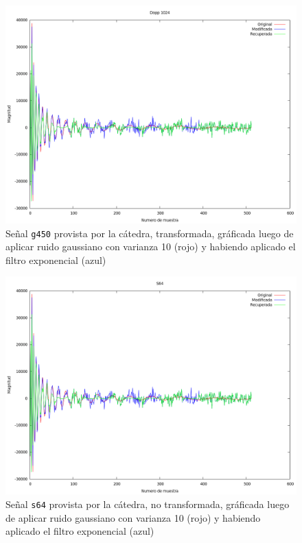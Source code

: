 \begin{figure}[H]
\begin {center}
\includegraphics[width=500pt]{imagenes/dopp1024-gauss-10-exp.png}
\end {center}
\caption{Se\~nal \texttt{g450} provista por la c\'atedra, transformada, gr\'aficada
luego de aplicar ruido gaussiano con varianza 10 (rojo) y 
habiendo aplicado el filtro exponencial (azul)}
\label{fig:GexpSpec}
\end{figure}

\begin{figure}[H]
\begin {center}
\includegraphics[width=500pt]{imagenes/s64-gauss-10-exp.png}
\end {center}
\caption{Se\~nal \texttt{s64} provista por la c\'atedra, no transformada, gr\'aficada
luego de aplicar ruido gaussiano con varianza 10 (rojo) y 
habiendo aplicado el filtro exponencial (azul)}
\label{fig:SexpSig}
\end{figure}

